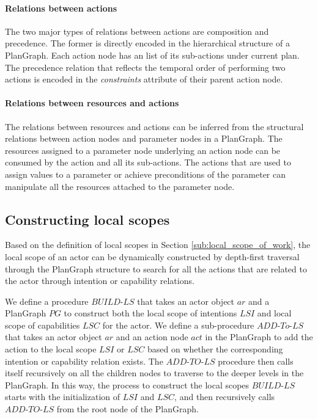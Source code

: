 \paragraph*{Relations between actions} %
\label{par:relations_between_actions}
The two major types of relations between actions are composition and precedence. The former is directly encoded in the hierarchical structure of a PlanGraph. Each action node has an list of its sub-actions under current plan. The precedence relation that reflects the temporal order of performing two actions is encoded in the \emph{constraints} attribute of their parent action node.

\paragraph*{Relations between resources and actions} %
\label{par:relations_between_resources_and_actions}
The relations between resources and actions can be inferred from the structural relations between action nodes and parameter nodes in a PlanGraph. The resources assigned to a parameter node underlying an action node can be consumed by the action and all its sub-actions. The actions that are used to assign values to a parameter or achieve preconditions of the parameter can manipulate all the resources attached to the parameter node.




\subsection{Constructing local scopes} %
\label{sub:representing_local_scopes}
Based on the definition of local scopes in Section \ref{sub:local_scope_of_work}, the local scope of an actor can be dynamically constructed by depth-first traversal through the PlanGraph structure to search for all the actions that are related to the actor through intention or capability relations.

We define a procedure $BUILD\textrm{-}LS$ that takes an actor object $ar$ and a PlanGraph $PG$ to construct both the local scope of intentions $LSI$ and local scope of capabilities $LSC$ for the actor. We define a sub-procedure $ADD\textrm{-}To\textrm{-}LS$ that takes an actor object $ar$ and an action node $act$ in the PlanGraph to add the action to the local scope $LSI$ or $LSC$ based on whether the corresponding intention or capability relation exists. The $ADD\textrm{-}TO\textrm{-}LS$ procedure then calls itself recursively on all the children nodes to traverse to the deeper levels in the PlanGraph. In this way, the process to construct the local scopes $BUILD\textrm{-}LS$ starts with the initialization of $LSI$ and $LSC$, and then recursively calls $ADD\textrm{-}TO\textrm{-}LS$ from the root node of the PlanGraph.

